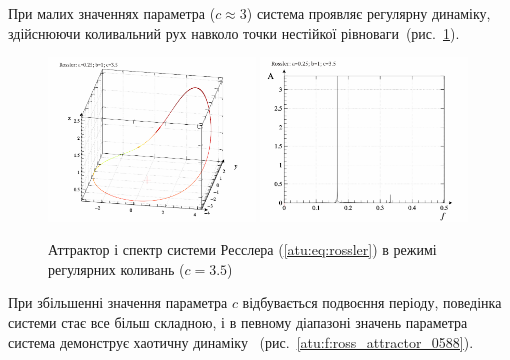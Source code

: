 При малих значеннях параметра (\(c \approx 3 \)) система проявляє
регулярну динаміку, здійснюючи коливальний рух навколо точки
нестійкої рівноваги~(рис.~\ref{atu:f:ross_attractor_0300}).

\begin{figure}[ht!]
\begin{center}
  \includegraphics[width=0.49\textwidth]{p/cha/ross/ross0-p_xyz_c=03x50.png}
  \hfill
  \includegraphics[width=0.49\textwidth]{p/cha/ross/ross_f-p_f_c=03x50.png}
\end{center}
\caption{Аттрактор і спектр системи Ресслера (\ref{atu:eq:rossler}) в режимі регулярних коливань ($c = 3.5$)}
\label{atu:f:ross_attractor_0300}
\end{figure}

При збільшенні значення параметра \(c\) відбувається подвоєння
періоду, поведінка системи стає все більш складною, і в певному
діапазоні значень параметра система демонструє хаотичну
динаміку~\cite{atu_st67} (рис.~\ref{atu:f:ross_attractor_0588}).

